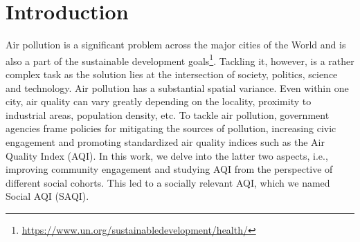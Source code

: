 \section{Introduction}
\label{sec:intro}

Air pollution is a significant problem across the major cities of the World and is also a part of the sustainable development goals\footnote{\url{https://www.un.org/sustainabledevelopment/health/}}. Tackling it, however, is a rather complex task as the solution lies at the intersection of society, politics, science and technology. Air pollution has a substantial spatial variance. Even within one city, air quality can vary greatly depending on the locality, proximity to industrial areas, population density, etc. To tackle air pollution, government agencies frame policies for mitigating the sources of pollution, increasing civic engagement and promoting standardized air quality indices such as the Air Quality Index (AQI). In this work, we delve into the latter two aspects, i.e., improving community engagement and studying AQI from the perspective of different social cohorts. This led to a socially relevant AQI, which we named Social AQI (SAQI). 

